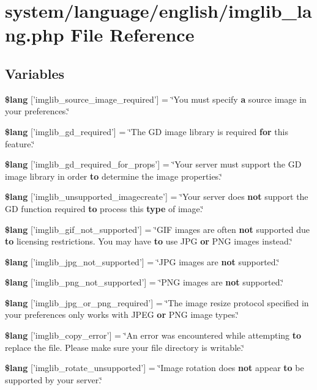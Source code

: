 \section{system/language/english/imglib\-\_\-lang.php File Reference}
\label{imglib__lang_8php}
\subsection*{Variables}
\begin{DoxyCompactItemize}
\item 
{\bf \$lang} ['imglib\-\_\-source\-\_\-image\-\_\-required'] = \char`\"{}You must specify {\bf a} source image in your preferences.\char`\"{}
\item 
{\bf \$lang} ['imglib\-\_\-gd\-\_\-required'] = \char`\"{}The G\-D image library is required {\bf for} this feature.\char`\"{}
\item 
{\bf \$lang} ['imglib\-\_\-gd\-\_\-required\-\_\-for\-\_\-props'] = \char`\"{}Your server must support the G\-D image library in order {\bf to} determine the image properties.\char`\"{}
\item 
{\bf \$lang} ['imglib\-\_\-unsupported\-\_\-imagecreate'] = \char`\"{}Your server does {\bf not} support the G\-D function required {\bf to} process this {\bf type} of image.\char`\"{}
\item 
{\bf \$lang} ['imglib\-\_\-gif\-\_\-not\-\_\-supported'] = \char`\"{}G\-I\-F images are often {\bf not} supported due {\bf to} licensing restrictions. You may have {\bf to} use J\-P\-G {\bf or} P\-N\-G images instead.\char`\"{}
\item 
{\bf \$lang} ['imglib\-\_\-jpg\-\_\-not\-\_\-supported'] = \char`\"{}J\-P\-G images are {\bf not} supported.\char`\"{}
\item 
{\bf \$lang} ['imglib\-\_\-png\-\_\-not\-\_\-supported'] = \char`\"{}P\-N\-G images are {\bf not} supported.\char`\"{}
\item 
{\bf \$lang} ['imglib\-\_\-jpg\-\_\-or\-\_\-png\-\_\-required'] = \char`\"{}The image resize protocol specified in your preferences only works with J\-P\-E\-G {\bf or} P\-N\-G image types.\char`\"{}
\item 
{\bf \$lang} ['imglib\-\_\-copy\-\_\-error'] = \char`\"{}An error was encountered while attempting {\bf to} replace the file. Please make sure your file directory is writable.\char`\"{}
\item 
{\bf \$lang} ['imglib\-\_\-rotate\-\_\-unsupported'] = \char`\"{}Image rotation does {\bf not} appear {\bf to} be supported by your server.\char`\"{}

\end{DoxyCompactItemize}
